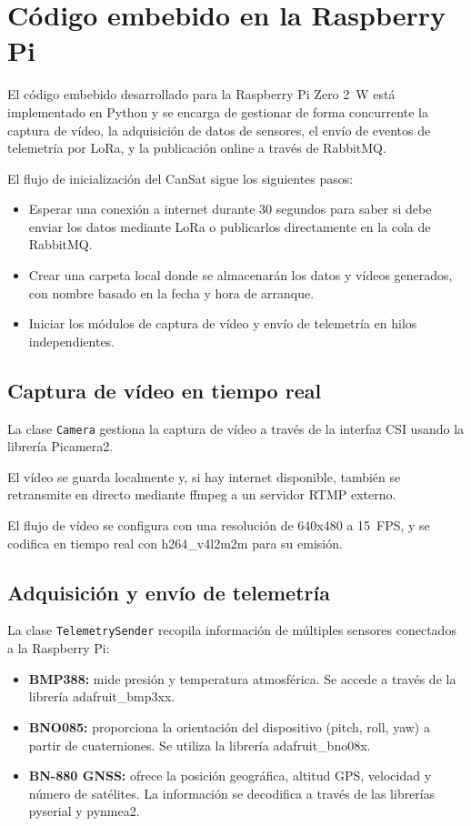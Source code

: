 \section{Código embebido en la Raspberry Pi}

El código embebido desarrollado para la Raspberry Pi Zero 2~W está implementado en Python y se encarga de gestionar de forma concurrente la captura de vídeo, la adquisición de datos de sensores, el envío de eventos de telemetría por LoRa, y la publicación online a través de RabbitMQ.

El flujo de inicialización del CanSat sigue los siguientes pasos:

\begin{itemize}
    \item Esperar una conexión a internet durante 30 segundos para saber si debe enviar los datos mediante LoRa o publicarlos directamente en la cola de RabbitMQ.
    \item Crear una carpeta local donde se almacenarán los datos y vídeos generados, con nombre basado en la fecha y hora de arranque.
    \item Iniciar los módulos de captura de vídeo y envío de telemetría en hilos independientes.
\end{itemize}

\subsection{Captura de vídeo en tiempo real}

La clase \texttt{Camera} gestiona la captura de vídeo a través de la interfaz CSI usando la librería Picamera2.

El vídeo se guarda localmente y, si hay internet disponible, también se retransmite en directo mediante ffmpeg a un servidor RTMP externo.

El flujo de vídeo se configura con una resolución de 640x480 a 15~FPS, y se codifica en tiempo real con h264\_v4l2m2m para su emisión.

\subsection{Adquisición y envío de telemetría}

La clase \texttt{TelemetrySender} recopila información de múltiples sensores conectados a la Raspberry Pi:

\begin{itemize}
    \item \textbf{BMP388:} mide presión y temperatura atmosférica.
    Se accede a través de la librería adafruit\_bmp3xx.
    \item \textbf{BNO085:} proporciona la orientación del dispositivo (pitch, roll, yaw) a partir de cuaterniones.
    Se utiliza la librería adafruit\_bno08x.
    \item \textbf{BN-880 GNSS:} ofrece la posición geográfica, altitud GPS, velocidad y número de satélites.
    La información se decodifica a través de las librerías pyserial y pynmea2.
\end{itemize}

